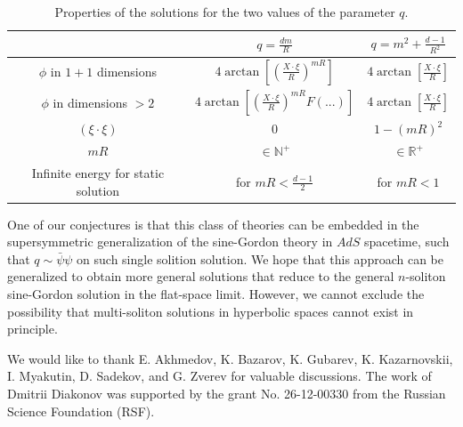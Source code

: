 \documentclass{article}
\begin{document}
\begin{table}[htbp]
\centering
\begin{tabular}{|c|c|c|}
\hline
 & $q=\frac{d m}{R}$ & $q=m^2+\frac{d-1}{R^2}$ \\
\hline
$\phi$ in $1+1$ dimensions & $4 \arctan\left[  \left(\frac{X \cdot \xi }{R}\right)^{m R}\right]$ & $4 \arctan\left[  \frac{X \cdot \xi }{R}\right]$ \\
\hline
$\phi$ in dimensions $>2$ & $4 \arctan\left[  \left(\frac{X \cdot \xi }{R}\right)^{m R}F(...)\right]$ & $4 \arctan\left[  \frac{X \cdot \xi }{R}\right]$ \\
\hline
$(\xi \cdot \xi)$ & 0 & $1-(m R)^2$ \\
\hline
$m R$  & $\in \mathbb{N}^+$ & $\in \mathbb{R}^+$ \\
\hline
Infinite energy for static solution & for $m R<\frac{d-1}{2}$ & for $mR<1$ \\
\hline
\end{tabular}
\caption{Properties of the solutions for the two values of the parameter $q$.}
\label{table}
\end{table}
One of our conjectures is that this class of theories can be embedded in the supersymmetric generalization of the sine-Gordon theory in $AdS$ spacetime, such that $q\sim \bar{\psi} \psi$ on such single solition solution. We hope that this approach can be generalized to obtain more general solutions that reduce to the general $n$-soliton sine-Gordon solution in the flat-space limit. However, we cannot exclude the possibility that multi-soliton solutions in hyperbolic spaces cannot exist in principle.

We would like to thank E. Akhmedov, K. Bazarov, K. Gubarev, K. Kazarnovskii, I. Myakutin, D. Sadekov, and G. Zverev for valuable discussions. The work of Dmitrii Diakonov was supported by the grant No. 26-12-00330 from the Russian Science Foundation (RSF).




\end{document}
